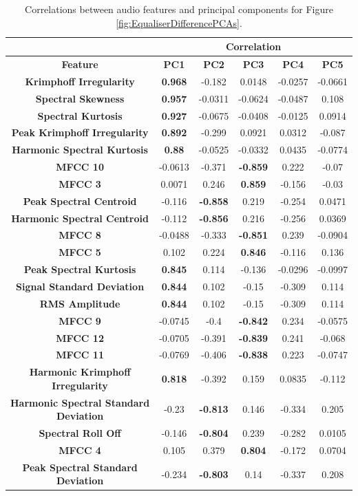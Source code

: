 		\begin{table}
			\centering
			\begin{tabular}{|c|c|c|c|c|c|}
				\cline{2-6}
				\multicolumn{1}{c|}{} & \multicolumn{5}{c|}{\bf{Correlation}} \tabularnewline
				\hline
				\bf{Feature} & \bf{PC1} & \bf{PC2} & \bf{PC3} & \bf{PC4} & \bf{PC5} \tabularnewline
				\hline
				\hline
				\bf{Krimphoff Irregularity} & \bf{0.968} & -0.182 & 0.0148 & -0.0257 & -0.0661 \tabularnewline
				\hline
				\bf{Spectral Skewness} & \bf{0.957} & -0.0311 & -0.0624 & -0.0487 & 0.108 \tabularnewline
				\hline
				\bf{Spectral Kurtosis} & \bf{0.927} & -0.0675 & -0.0408 & -0.0125 & 0.0914 \tabularnewline
				\hline
				\bf{Peak Krimphoff Irregularity} & \bf{0.892} & -0.299 & 0.0921 & 0.0312 & -0.087 \tabularnewline
				\hline
				\bf{Harmonic Spectral Kurtosis} & \bf{0.88} & -0.0525 & -0.0332 & 0.0435 & -0.0774 \tabularnewline
				\hline
				\bf{MFCC 10} & -0.0613 & -0.371 & \bf{-0.859} & 0.222 & -0.07 \tabularnewline
				\hline
				\bf{MFCC 3} & 0.0071 & 0.246 & \bf{0.859} & -0.156 & -0.03 \tabularnewline
				\hline
				\bf{Peak Spectral Centroid} & -0.116 & \bf{-0.858} & 0.219 & -0.254 & 0.0471 \tabularnewline
				\hline
				\bf{Harmonic Spectral Centroid} & -0.112 & \bf{-0.856} & 0.216 & -0.256 & 0.0369 \tabularnewline
				\hline
				\bf{MFCC 8} & -0.0488 & -0.333 & \bf{-0.851} & 0.239 & -0.0904 \tabularnewline
				\hline
				\bf{MFCC 5} & 0.102 & 0.224 & \bf{0.846} & -0.116 & 0.136 \tabularnewline
				\hline
				\bf{Peak Spectral Kurtosis} & \bf{0.845} & 0.114 & -0.136 & -0.0296 & -0.0997 \tabularnewline
				\hline
				\bf{Signal Standard Deviation} & \bf{0.844} & 0.102 & -0.15 & -0.309 & 0.114 \tabularnewline
				\hline
				\bf{RMS Amplitude} & \bf{0.844} & 0.102 & -0.15 & -0.309 & 0.114 \tabularnewline
				\hline
				\bf{MFCC 9} & -0.0745 & -0.4 & \bf{-0.842} & 0.234 & -0.0575 \tabularnewline
				\hline
				\bf{MFCC 12} & -0.0705 & -0.391 & \bf{-0.839} & 0.241 & -0.068 \tabularnewline
				\hline
				\bf{MFCC 11} & -0.0769 & -0.406 & \bf{-0.838} & 0.223 & -0.0747 \tabularnewline
				\hline
				\bf{Harmonic Krimphoff Irregularity} & \bf{0.818} & -0.392 & 0.159 & 0.0835 & -0.112 \tabularnewline
				\hline
				\bf{Harmonic Spectral Standard Deviation} & -0.23 & \bf{-0.813} & 0.146 & -0.334 & 0.205 \tabularnewline
				\hline
				\bf{Spectral Roll Off} & -0.146 & \bf{-0.804} & 0.239 & -0.282 & 0.0105 \tabularnewline
				\hline
				\bf{MFCC 4} & 0.105 & 0.379 & \bf{0.804} & -0.172 & 0.0704 \tabularnewline
				\hline
				\bf{Peak Spectral Standard Deviation} & -0.234 & \bf{-0.803} & 0.14 & -0.337 & 0.208 \tabularnewline
				\hline
			\end{tabular}
			\caption{Correlations between audio features and principal components for Figure
				 \ref{fig:EqualiserDifferencePCAs}.}
			\label{fig:EqualiserDifferenceCorrelations}
		\end{table}
